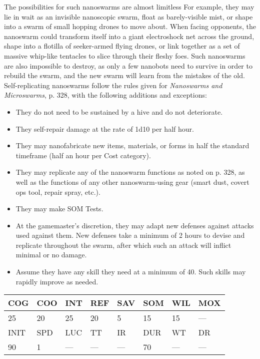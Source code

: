 The possibilities for such nanoswarms are almost limitless For example, they may lie in wait as an invisible nanoscopic swarm, float as barely-visible mist, or shape into a swarm of small hopping drones to move about. When facing opponents, the nanoswarm could transform itself into a giant electroshock net across the ground, shape into a flotilla of seeker-armed flying drones, or link together as a set of massive whip-like tentacles to slice through their fleshy foes. Such nanoswarms are also impossible to destroy, as only a few nanobots need to survive in order to rebuild the swarm, and the new swarm will learn from the mistakes of the old. Self-replicating nanoswarms follow the rules given for \textit{Nanoswarms and Microswarms}, p. 328, with the following additions and exceptions: 

\begin{itemize} \item They do not need to be sustained by a hive and do not deteriorate. \item They self-repair damage at the rate of 1d10 per half hour. \item They may nanofabricate new items, materials, or forms in half the standard timeframe (half an hour per Cost category). \item They may replicate any of the nanoswarm functions as noted on p. 328, as well as the functions of any other nanoswarm-using gear (smart dust, covert ops tool, repair spray, etc.). \item They may make SOM Tests. \item At the gamemaster's discretion, they may adapt new defenses against attacks used against them. New defenses take a minimum of 2 hours to devise and replicate throughout the swarm, after which such an attack will inflict minimal or no damage. \item Assume they have any skill they need at a minimum of 40. Such skills may rapidly improve as needed. \end{itemize} 

\begin{tabular}{|l|l|l|l|l|l|l|l|} \hline

COG &COO &INT &REF &SAV &SOM &WIL &MOX \\ \hline

25 &20 &25 &20 &5 &15 &15 &— \\ \hline

INIT &SPD &LUC &TT &IR &DUR &WT &DR \\ \hline

90 &1 &— &— &— &70 &— &— \\ \hline

\end{tabular} 





